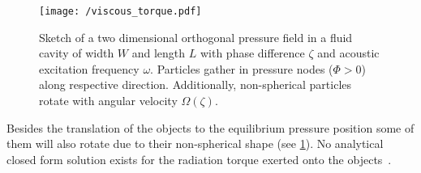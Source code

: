 \begin{figure}[tbp]
  \centering
  \texttt{[image: /viscous\_torque.pdf]}
  \caption{Sketch of a two dimensional orthogonal pressure field in a fluid 
    cavity of width $W$ and length $L$ with phase difference $\zeta$ and 
  acoustic excitation frequency $\omega$. Particles gather in pressure nodes 
($\Phi > 0$) along respective direction. Additionally, non-spherical particles 
rotate with angular velocity $\Omega\left( \zeta \right)$.}
  \label{fig:TA-viscous_torque}
\end{figure}

Besides the translation of the objects to the equilibrium pressure position 
some of them will also rotate due to their non-spherical shape (see 
\cref{fig:TA-viscous_torque}). No analytical closed form solution exists for 
the radiation torque exerted onto the objects~\cite{Lamprecht2017}.


